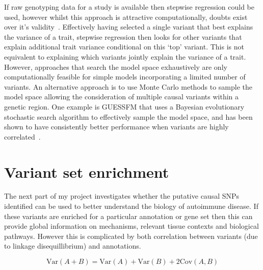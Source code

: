 \documentclass[a4paper,11pt]{report}
\begin{document}
If raw genotyping data for a study is available then stepwise regression could be used, however whilst this approach is attractive computationally, doubts exist over it's validity~\citep{miller-1984}. Effectively having selected a single variant that best explains the variance of a trait, stepwise regression then looks for other variants that explain additional trait variance conditional on this `top' variant. This is not equivalent to explaining which variants jointly explain the variance of a trait. However, approaches that search the model space exhaustively are only computationally feasible for simple models incorporating a limited number of variants. An alternative approach is to use Monte Carlo methods to sample the model space allowing the consideration of multiple causal variants within a genetic region. One example is GUESSFM that uses a Bayesian evolutionary stochastic search algorithm to effectively sample the model space, and has been shown to have consistently better performance when variants are highly correlated~\cite{WallaceCutlerPontikosEtAl2015}. 

\section{Variant set enrichment}
The next part of my project investigates whether the putative causal SNPs identified can be used to better understand the biology of autoimmune disease.  If these variants  are enriched for a particular annotation or gene set then this can provide global information on mechanisms, relevant tissue contexts and biological pathways. However this is complicated by both correlation between variants (due to linkage disequillibrium) and annotations. 

\begin{equation}
	\text{Var}(A + B) = \text{Var}(A) + \text{Var}(B) + 2\text{Cov}(A,B)
\end{equation}
\end{document}
